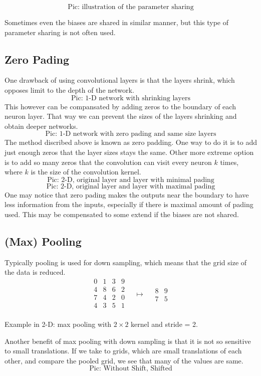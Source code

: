 \documentclass[]{article}
\begin{document}
\[
\text{Pic: illustration of the parameter sharing}
\]

Sometimes even the biases are shared in similar manner, but this type of
parameter sharing is not often used.

\subsection{Zero Pading}
One drawback of using convolutional layers is that the layers shrink, which
opposes limit to the depth of the network.
\[
\text{Pic: 1-D network with shrinking layers}
\]
This however can be compansated by
adding zeros to the boundary of each neuron layer. That way we can prevent the
sizes of the layers shrinking and obtain deeper networks.
\[
\text{Pic: 1-D network with zero pading and same size layers}
\]
The method discribed above is known as zero padding. One way to do it is to add
just enough zeros that the layer sizes stays the same. Other more extreme option
is to add so many zeros that the convolution can visit every neuron $k$ times,
where $k$ is the size of the convolution kernel.
\[
\text{Pic: 2-D, original layer and layer with minimal pading}
\]
\[
\text{Pic: 2-D, original layer and layer with maximal pading}
\]
One may notice that zero pading makes the outputs near the boundary to have less
information from the inputs, especially if there is maximal amount of pading
used. This may be compensated to some extend if the biases are not shared.
\subsection{(Max) Pooling}
Typically pooling is used for down sampling, which means that the grid size of
the data is reduced.
\[
\begin{array}{c|c|c|c}
  0 & 1 & 3 & 9\\
  \hline
  4 & 8 & 6 & 2\\
  \hline
  7 & 4 & 2 & 0\\
  \hline
  4 & 3 & 5 & 1\\
 \end{array}
 \quad \mapsto \quad
 \begin{array}{c|c}
   8 & 9\\
   \hline
   7 & 5
  \end{array}
 \]
\begin{center}Example in 2-D: max pooling with $2\times2$ kernel and stride = 2.\end{center}
Another benefit of max pooling with down sampling is that it is not so sensitive
to small translations. If we take to grids, which are small translations of each
other, and compare the pooled grid, we see that many of the values are same.
\[
\text{Pic: Without Shift, Shifted}
\]
\end{document}
